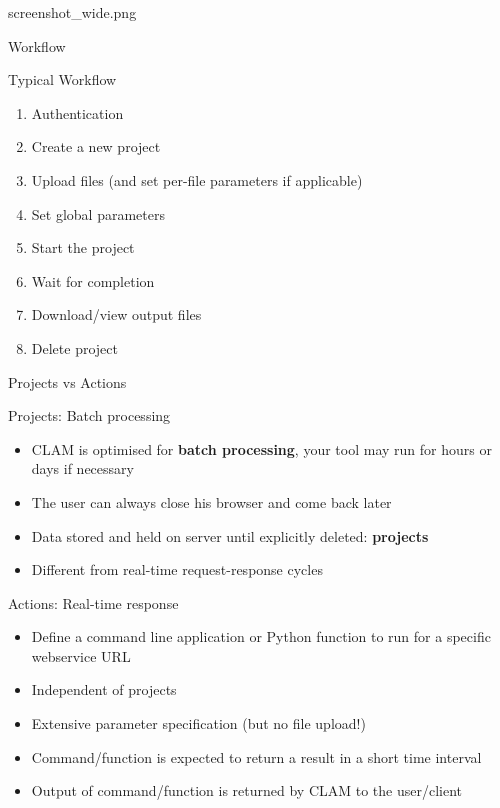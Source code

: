 \documentclass[xcolor=table,10pt,t]{beamer}
\begin{document}
\begin{tussenpagina}{}{}{screenshot_wide.png}
\end{tussenpagina}

\begin{frame}{Workflow}
  \begin{block}{Typical Workflow}
      \begin{enumerate}
        \item Authentication
        \item Create a new project
        \item Upload files (and set per-file parameters if applicable)
        \item Set global parameters
        \item Start the project
        \item Wait for completion
        \item Download/view output files
        \item Delete project
      \end{enumerate}
  \end{block}
\end{frame}



\begin{frame}{Projects vs Actions}
    \begin{block}{Projects: Batch processing}
      \begin{itemize}
        \item CLAM is optimised for \textbf{batch processing}, your tool may run for hours or days if necessary
        \item The user can always close his browser and come back later
        \item Data stored and held on server until explicitly deleted: \textbf{projects}
        \item Different from real-time request-response cycles
      \end{itemize}
    \end{block}

    \begin{block}{Actions: Real-time response}
      \begin{itemize}
        \item Define a command line application or Python function to run for a specific webservice URL
        \item Independent of projects
        \item Extensive parameter specification (but no file upload!)
        \item Command/function is expected to return a result in a short time interval
        \item Output of command/function is returned by CLAM to the user/client
      \end{itemize}
    \end{block}
\end{frame}
\end{document}
